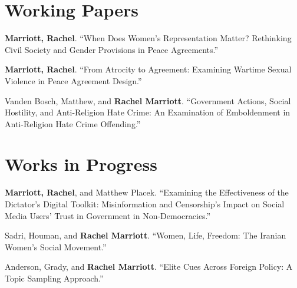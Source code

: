 \documentclass[11pt]{article}
\begin{document}

\section{Working Papers}

\begin{refs}

\item \textbf{Marriott, Rachel}.
``When Does Women's Representation Matter? Rethinking Civil Society and Gender Provisions in Peace Agreements.''

\item \textbf{Marriott, Rachel}.
``From Atrocity to Agreement: Examining Wartime Sexual Violence in Peace Agreement Design.''

\item Vanden Bosch, Matthew, and \textbf{Rachel Marriott}.
``Government Actions, Social Hostility, and Anti-Religion Hate Crime: An Examination of Emboldenment in Anti-Religion Hate Crime Offending.''

\end{refs}


\section{Works in Progress}

\begin{refs}

\item \textbf{Marriott, Rachel}, and Matthew Placek.
``Examining the Effectiveness of the Dictator's Digital Toolkit: Misinformation and Censorship's Impact on Social Media Users' Trust in Government in Non-Democracies.''

\item Sadri, Houman, and \textbf{Rachel Marriott}.
``Women, Life, Freedom: The Iranian Women's Social Movement.''

\item Anderson, Grady, and \textbf{Rachel Marriott}.
``Elite Cues Across Foreign Policy: A Topic Sampling Approach.''

\end{refs}

\end{document}
